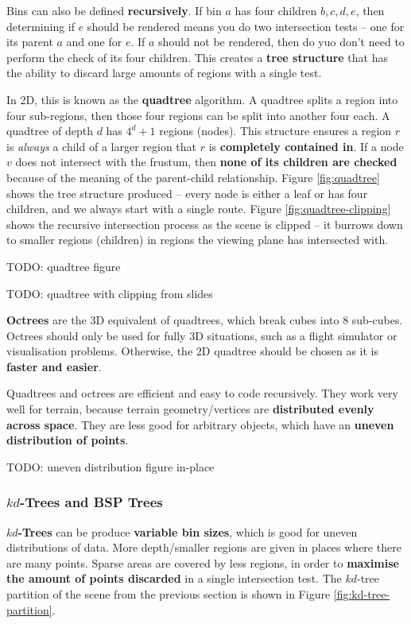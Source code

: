 \documentclass{article}
\begin{document}
Bins can also be defined \textbf{recursively}. If bin $a$ has four children $b, c, d, e$, then determining if $e$ should be rendered means you do two intersection tests -- one for its parent $a$ and one for $e$. If $a$ should not be rendered, then do yuo don't need to perform the check of its four children. This creates a \textbf{tree structure} that has the ability to discard large amounts of regions with a single test.

In 2D, this is known as the \textbf{quadtree} algorithm. A quadtree splits a region into four sub-regions, then those four regions can be split into another four each. A quadtree of depth $d$ has $4^d + 1$ regions (nodes). This structure ensures a region $r$ is \textit{always} a child of a larger region that $r$ is \textbf{completely contained in}. If a node $v$ does not intersect with the frustum, then \textbf{none of its children are checked} because of the meaning of the parent-child relationship. Figure \ref{fig:quadtree} shows the tree structure produced -- every node is either a leaf or has four children, and we always start with a single route. Figure \ref{fig:quadtree-clipping} shows the recursive intersection process as the scene is clipped -- it burrows down to smaller regions (children) in regions the viewing plane has intersected with.

TODO: quadtree figure

TODO: quadtree with clipping from slides

\textbf{Octrees} are the 3D equivalent of quadtrees, which break cubes into 8 sub-cubes. Octrees should only be used for fully 3D situations, such as a flight simulator or visualisation problems. Otherwise, the 2D quadtree should be chosen as it is \textbf{faster and easier}.

Quadtrees and octrees are efficient and easy to code recursively. They work very well for terrain, because terrain geometry/vertices are \textbf{distributed evenly across space}. They are less good for arbitrary objects, which have an \textbf{uneven distribution of points}.

TODO: uneven distribution figure in-place

\subsubsection{$kd$-Trees and BSP Trees}

\textbf{$kd$-Trees} can be produce \textbf{variable bin sizes}, which is good for uneven distributions of data. More depth/smaller regions are given in places where there are many points. Sparse areas are covered by less regions, in order to \textbf{maximise the amount of points discarded} in a single intersection test. The $kd$-tree partition of the scene from the previous section is shown in Figure \ref{fig:kd-tree-partition}.
\end{document}
